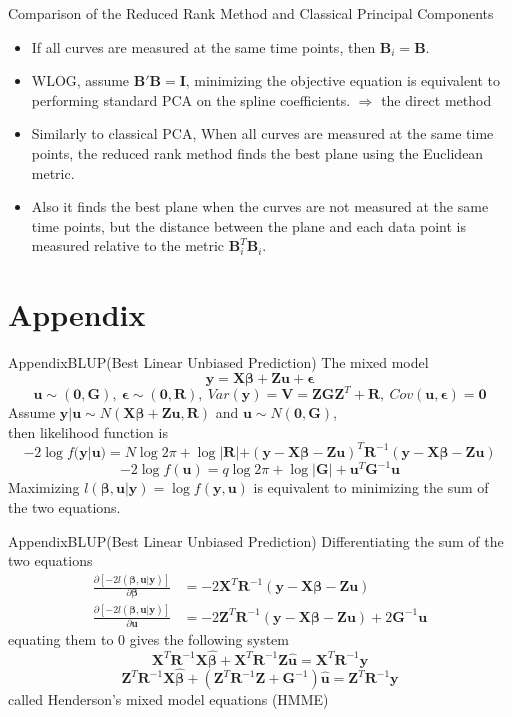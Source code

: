 \documentclass{beamer}
\def \by {\mathbf{y}}
\def \bX {\mathbf{X}}
\def \bB {\mathbf{B}}
\def \bbeta {\boldsymbol{\beta}}
\def \bepsilon {\boldsymbol{\epsilon}}
\def \bR {\boldsymbol{R}}
\def \bZ {\boldsymbol{Z}}
\def \bG {\boldsymbol{G}}
\def \bu {\boldsymbol{u}}
\def \bV {\boldsymbol{V}}
\begin{document}
\begin{frame}{Comparison of the Reduced Rank Method and Classical Principal Components}
	
	\begin{itemize}
		\item {
			If all curves are measured at the same time points, then $\mathbf{B}_i=\mathbf{B}$.
		}
		\item {
			WLOG, assume $\mathbf{B'B=I}$, minimizing the objective equation is equivalent to performing standard PCA on the spline coefficients. $\Rightarrow$ the direct method
		}
		\item {
			Similarly to classical PCA, When all curves are measured at the same time points, the reduced rank method finds the best plane using the Euclidean metric.
		}
		\item {
			Also it finds the best plane when the curves are not measured at the same time points, but the distance between the plane and each data point is measured relative to the metric $\bB_i^T\bB_i$.
		}
	\end{itemize}
\end{frame}


\section{Appendix}
\begin{frame}{Appendix}{BLUP(Best Linear Unbiased Prediction)}
	The mixed model
	$$\by = \bX \bbeta+\bZ\bu+\bepsilon$$
	$$\bu \sim (\mathbf{0},\bG), \ \bepsilon \sim (\mathbf{0},\bR), \ Var(\by)=\bV=\bZ\bG\bZ^T+\bR, \ Cov(\bu,\bepsilon)=\mathbf{0} $$
	Assume $\by|\bu \sim N(\bX \bbeta+\bZ\bu,\bR)$ and $\bu \sim N(\mathbf{0},\bG)$,\\
	then likelihood function is
	$$ -2\log f(\by|\bu)=N\log 2\pi+\log|\bR|+(\by-\bX  \bbeta-\bZ\bu)^T\bR^{-1}(\by-\bX \bbeta-\bZ\bu) $$
	$$ -2\log f(\bu)= q\log 2\pi + \log|\bG| + \bu^T\bG^{-1}\bu $$
	Maximizing $l(\bbeta,\bu|\by)=\log f(\by,\bu)$ is equivalent to minimizing the sum of the two equations.
\end{frame}

\begin{frame}{Appendix}{BLUP(Best Linear Unbiased Prediction)}
	Differentiating the sum of the two equations
	$$ \begin{aligned}
	\frac{\partial [-2l(\bbeta,\bu|\by)]}{\partial \bbeta} &= -2\bX^T\bR^{-1}(\by-\bX\bbeta-\bZ\bu)\\
	\frac{\partial [-2l(\bbeta,\bu|\by)]}{\partial \bu} &= -2\bZ^T\bR^{-1}(\by-\bX\bbeta-\bZ\bu)+2\bG^{-1}\bu
	\end{aligned} $$ 
	equating them to $0$ gives the following system 
	$$ \bX^T\bR^{-1}\bX\hat{\bbeta}+\bX^T\bR^{-1}\bZ\hat{\bu}=\bX^T\bR^{-1}\by $$
	$$ \bZ^T\bR^{-1}\bX\hat{\bbeta}+(\bZ^T\bR^{-1}\bZ+\bG^{-1})\hat{\bu}=\bZ^T\bR^{-1}\by $$
	called Henderson's mixed model equations (HMME)
\end{frame}
\end{document}
